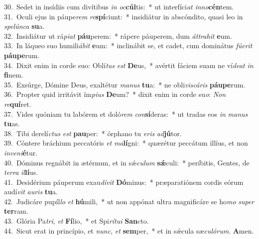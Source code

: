 {30.~}Sedet in insídiis cum divítibus \textit{in} \textit{oc}\textbf{cúl}tis:~* ut interfíci\textit{at} \textit{in}\textit{no}\textbf{cén}tem.\\
{31.~}Oculi ejus in páupe\textit{rem} \textit{re}\textbf{spí}ciunt:~* insidiátur in abscóndito, quasi leo in \textit{spe}\textit{lún}\textit{ca} \textbf{su}a.\\
{32.~}Insidiátur ut rá\textit{pi}\textit{at} \textbf{páu}perem:~* rápere páuperem, dum \textit{át}\textit{tra}\textit{hit} \textbf{e}um.\\
{33.~}In láqueo suo humili\textit{á}\textit{bit} \textbf{e}um:~* inclinábit se, et cadet, cum dominátus \textit{fú}\textit{e}\textit{rit} \textbf{páu}\textbf{pe}rum.\\
{34.~}Dixit enim in corde suo: Oblí\textit{tus} \textit{est} \textbf{De}us,~* avértit fáciem suam ne ví\textit{de}\textit{at} \textit{in} \textbf{fi}nem.\\
{35.~}Exsúrge, Dómine Deus, exaltétur \textit{ma}\textit{nus} \textbf{tu}a:~* ne obli\textit{vi}\textit{scá}\textit{ris} \textbf{páu}\textbf{pe}rum.\\
{36.~}Propter quid irritávit ím\textit{pi}\textit{us} \textbf{De}um?~* dixit enim in corde su\textit{o}: \textit{Non} \textit{re}\textbf{quí}ret.\\
{37.~}Vides quóniam tu labórem et doló\textit{rem} \textit{con}\textbf{sí}deras:~* ut tradas eos \textit{in} \textit{ma}\textit{nus} \textbf{tu}as.\\
{38.~}Tibi derelí\textit{ctus} \textit{est} \textbf{pau}per:~* órphano tu \textit{e}\textit{ris} \textit{ad}\textbf{jú}tor.\\
{39.~}Cóntere bráchium peccatóris \textit{et} \textit{ma}\textbf{lí}gni:~* quærétur peccátum illíus, et non \textit{in}\textit{ve}\textit{ni}\textbf{é}tur.\\
{40.~}Dóminus regnábit in ætérnum, et in sǽ\textit{cu}\textit{lum} \textbf{sǽ}culi:~* períbitis, Gentes, de \textit{ter}\textit{ra} \textit{il}\textbf{lí}us.\\
{41.~}Desidérium páuperum exau\textit{dí}\textit{vit} \textbf{Dó}minus:~* præparatiónem cordis eórum audí\textit{vit} \textit{au}\textit{ris} \textbf{tu}a.\\
{42.~}Judicáre pupíl\textit{lo} \textit{et} \textbf{hú}mili,~* ut non appónat ultra magnificáre se ho\textit{mo} \textit{su}\textit{per} \textbf{ter}ram.\\
{43.~}Glória Pa\textit{tri}, \textit{et} \textbf{Fí}lio,~* et Spi\textit{rí}\textit{tu}\textit{i} \textbf{San}cto.\\
{44.~}Sicut erat in princípio, et \textit{nunc}, \textit{et} \textbf{sem}per,~* et in sǽcula sæ\textit{cu}\textit{ló}\textit{rum}. \textbf{A}men.\\
